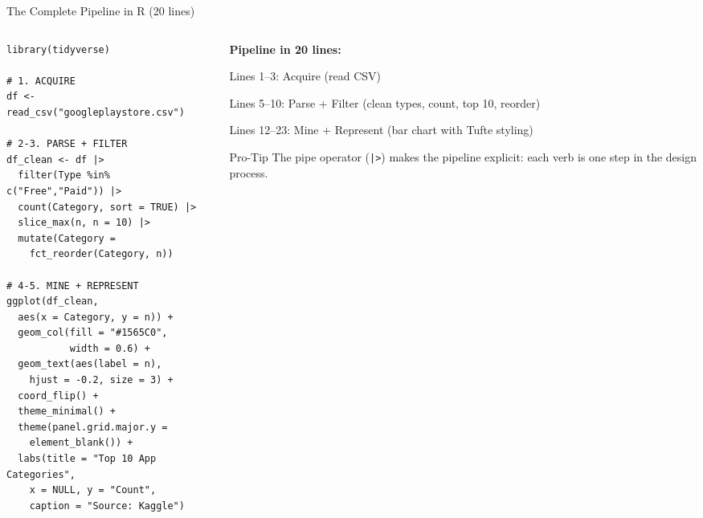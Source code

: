 \documentclass[10pt]{beamer}
\begin{document}
\begin{frame}[fragile]{The Complete Pipeline in R (20 lines)}
  \begin{columns}[T]
    \begin{column}{0.55\textwidth}
\begin{lstlisting}[style=rstyle]
library(tidyverse)

# 1. ACQUIRE
df <- read_csv("googleplaystore.csv")

# 2-3. PARSE + FILTER
df_clean <- df |>
  filter(Type %in% c("Free","Paid")) |>
  count(Category, sort = TRUE) |>
  slice_max(n, n = 10) |>
  mutate(Category =
    fct_reorder(Category, n))

# 4-5. MINE + REPRESENT
ggplot(df_clean,
  aes(x = Category, y = n)) +
  geom_col(fill = "#1565C0",
           width = 0.6) +
  geom_text(aes(label = n),
    hjust = -0.2, size = 3) +
  coord_flip() +
  theme_minimal() +
  theme(panel.grid.major.y =
    element_blank()) +
  labs(title = "Top 10 App Categories",
    x = NULL, y = "Count",
    caption = "Source: Kaggle")
\end{lstlisting}
    \end{column}
    \begin{column}{0.42\textwidth}
      \textbf{Pipeline in 20 lines:}

      \vspace{4pt}
      Lines 1--3: Acquire (read CSV)

      Lines 5--10: Parse + Filter (clean
      types, count, top 10, reorder)

      Lines 12--23: Mine + Represent
      (bar chart with Tufte styling)

      \vspace{8pt}
      \begin{alertblock}{Pro-Tip}
        The pipe operator (\texttt{|>})
        makes the pipeline explicit:
        each verb is one step in the
        design process.
      \end{alertblock}
    \end{column}
  \end{columns}
\end{frame}
\end{document}
